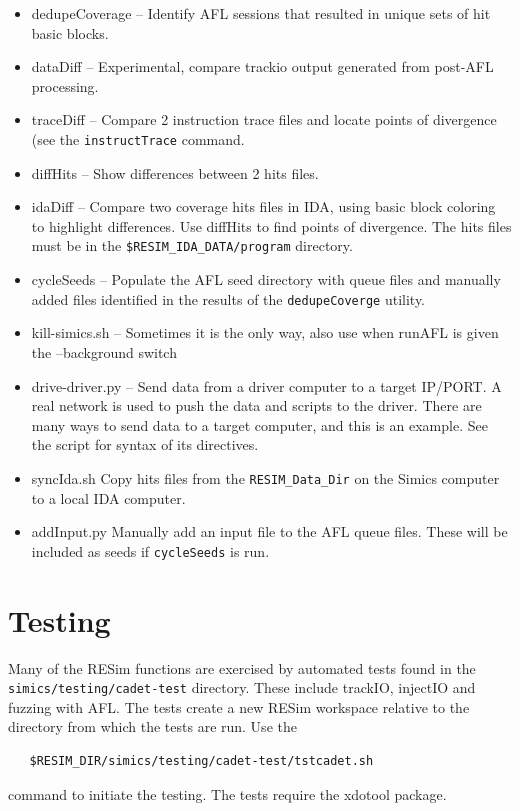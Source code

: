 \documentclass[titlepage]{article}
\begin{document}
\begin{itemize}
\item dedupeCoverage -- Identify AFL sessions that resulted in unique sets of hit basic blocks.
\item dataDiff -- Experimental, compare trackio output generated from post-AFL processing.
\item traceDiff -- Compare 2 instruction trace files and locate points of divergence (see the {\tt instructTrace} command.
\item diffHits -- Show differences between 2 hits files.
\item idaDiff -- Compare two coverage hits files in IDA, using basic block coloring to highlight differences.  Use diffHits to find points
of divergence.  The hits files must be in the {\tt \$RESIM\_IDA\_DATA/program} directory.
\item cycleSeeds -- Populate the AFL seed directory with queue files and manually added files identified in the results of the {\tt dedupeCoverge} utility.
\item kill-simics.sh -- Sometimes it is the only way, also use when runAFL is given the --background switch
\item drive-driver.py -- Send data from a driver computer to a target IP/PORT.  A real network is used to push the data and scripts
to the driver.  There are many ways to send data to a target computer, and this is an example.  See the script for syntax of its directives.
\item syncIda.sh Copy hits files from the {\tt RESIM\_Data\_Dir} on the Simics computer to a local IDA computer.
\item addInput.py Manually add an input file to the AFL queue files.  These will be included as seeds if {\tt cycleSeeds} is run.
\end{itemize}

\section{Testing}
Many of the RESim functions are exercised by automated tests found in the {\tt simics/testing/cadet-test} directory.
These include trackIO, injectIO and fuzzing with AFL.  The tests create a new RESim workspace relative to
the directory from which the tests are run.  Use the
\begin{verbatim}
   $RESIM_DIR/simics/testing/cadet-test/tstcadet.sh
\end{verbatim}
\noindent command to initiate the testing.  The tests require the xdotool package.
\end{document}
